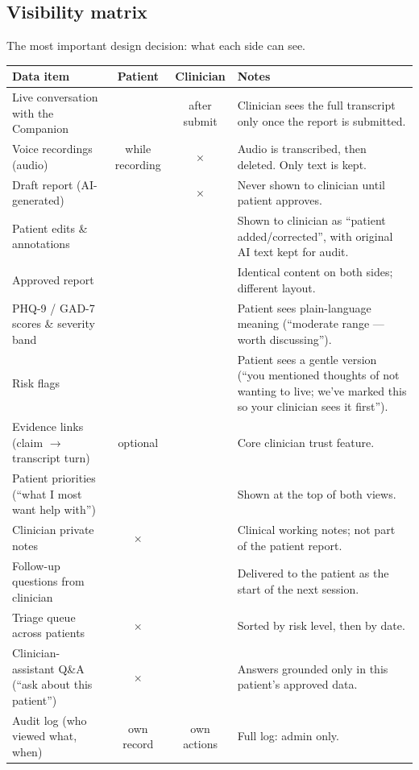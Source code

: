 \documentclass[11pt]{article}
\newcommand{\yes}{\textcolor{patient}{\checkmark}}
\newcommand{\no}{\textcolor{danger}{$\times$}}
\newcommand{\some}[1]{\textcolor{store}{\small #1}}
\begin{document}
\subsection{Visibility matrix}
The most important design decision: what each side can see.

\medskip
\renewcommand{\arraystretch}{1.25}
\begin{tabularx}{\textwidth}{@{}X c c X@{}}
\toprule
\textbf{Data item} & \textbf{Patient} & \textbf{Clinician} & \textbf{Notes} \\
\midrule
Live conversation with the Companion & \yes & \some{after submit} & Clinician sees the full transcript only once the report is submitted. \\
Voice recordings (audio) & \some{while recording} & \no & Audio is transcribed, then deleted. Only text is kept. \\
Draft report (AI-generated) & \yes & \no & Never shown to clinician until patient approves. \\
Patient edits \& annotations & \yes & \yes & Shown to clinician as ``patient added/corrected'', with original AI text kept for audit. \\
Approved report & \yes & \yes & Identical content on both sides; different layout. \\
PHQ-9 / GAD-7 scores \& severity band & \yes & \yes & Patient sees plain-language meaning (``moderate range --- worth discussing''). \\
Risk flags & \yes & \yes & Patient sees a gentle version (``you mentioned thoughts of not wanting to live; we've marked this so your clinician sees it first''). \\
Evidence links (claim $\rightarrow$ transcript turn) & \some{optional} & \yes & Core clinician trust feature. \\
Patient priorities (``what I most want help with'') & \yes & \yes & Shown at the top of both views. \\
Clinician private notes & \no & \yes & Clinical working notes; not part of the patient report. \\
Follow-up questions from clinician & \yes & \yes & Delivered to the patient as the start of the next session. \\
Triage queue across patients & \no & \yes & Sorted by risk level, then by date. \\
Clinician-assistant Q\&A (``ask about this patient'') & \no & \yes & Answers grounded only in this patient's approved data. \\
Audit log (who viewed what, when) & \some{own record} & \some{own actions} & Full log: admin only. \\
\bottomrule
\end{tabularx}
\renewcommand{\arraystretch}{1.0}
\end{document}
